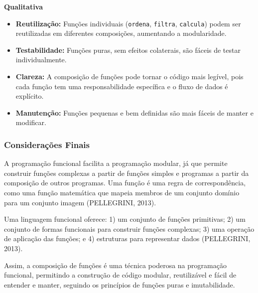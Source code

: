\textbf{Qualitativa}
\begin{itemize}
    \item \textbf{Reutilização:} Funções individuais (\texttt{ordena}, \texttt{filtra}, \texttt{calcula}) podem ser reutilizadas em diferentes composições, aumentando a modularidade.
    \item \textbf{Testabilidade:} Funções puras, sem efeitos colaterais, são fáceis de testar individualmente.
    \item \textbf{Clareza:} A composição de funções pode tornar o código mais legível, pois cada função tem uma responsabilidade específica e o fluxo de dados é explícito.
    \item \textbf{Manutenção:} Funções pequenas e bem definidas são mais fáceis de manter e modificar.
\end{itemize}

\subsubsection{Considerações Finais}
A programação funcional facilita a programação modular, já que permite construir funções complexas a partir de funções simples e programas a partir da composição de outros programas. Uma função é uma regra de correspondência, como uma função matemática que mapeia membros de um conjunto domínio para um conjunto imagem (PELLEGRINI, 2013).

Uma linguagem funcional oferece: 1) um conjunto de funções primitivas; 2) um conjunto de formas funcionais para construir funções complexas; 3) uma operação de aplicação das funções; e 4) estruturas para representar dados (PELLEGRINI, 2013).

Assim, a composição de funções é uma técnica poderosa na programação funcional, permitindo a construção de código modular, reutilizável e fácil de entender e manter, seguindo os princípios de funções puras e imutabilidade.




